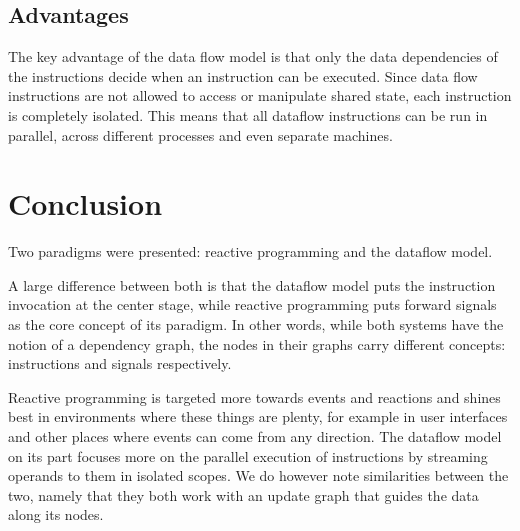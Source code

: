 \subsection{Advantages}

The key advantage of the data flow model is that only the data dependencies of the instructions decide when an instruction can be executed. Since data flow instructions are not allowed to access or manipulate shared state, each instruction is completely isolated. This means that all dataflow instructions can be run in parallel, across different processes and even separate machines.

\section{Conclusion}

Two paradigms were presented: reactive programming and the dataflow model. 

A large difference between both is that the dataflow model puts the instruction invocation at the center stage, while reactive programming puts forward signals as the core concept of its paradigm. In other words, while both systems have the notion of a dependency graph, the nodes in their graphs carry different concepts: instructions and signals respectively.

Reactive programming is targeted more towards events and reactions and shines best in environments where these things are plenty, for example in user interfaces and other places where events can come from any direction. The dataflow model on its part focuses more on the parallel execution of instructions by streaming operands to them in isolated scopes. We do however note similarities between the two, namely that they both work with an update graph that guides the data along its nodes. 



